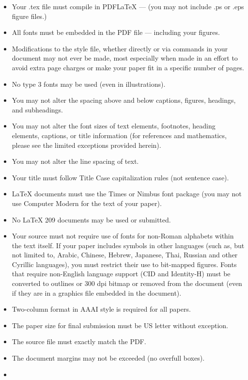 \begin{itemize}
\tightlist
\item
  Your .tex file must compile in PDF{\LaTeX} --- (you may not include
  .ps or .eps figure files.)
\item
  All fonts must be embedded in the PDF file --- including your figures.
\item
  Modifications to the style file, whether directly or via commands in
  your document may not ever be made, most especially when made in an
  effort to avoid extra page charges or make your paper fit in a
  specific number of pages.
\item
  No type 3 fonts may be used (even in illustrations).
\item
  You may not alter the spacing above and below captions, figures,
  headings, and subheadings.
\item
  You may not alter the font sizes of text elements, footnotes, heading
  elements, captions, or title information (for references and
  mathematics, please see the limited exceptions provided herein).
\item
  You may not alter the line spacing of text.
\item
  Your title must follow Title Case capitalization rules (not sentence
  case).
\item
  {\LaTeX} documents must use the Times or Nimbus font package (you may
  not use Computer Modern for the text of your paper).
\item
  No {\LaTeX} 209 documents may be used or submitted.
\item
  Your source must not require use of fonts for non-Roman alphabets
  within the text itself. If your paper includes symbols in other
  languages (such as, but not limited to, Arabic, Chinese, Hebrew,
  Japanese, Thai, Russian and other Cyrillic languages), you must
  restrict their use to bit-mapped figures. Fonts that require
  non-English language support (CID and Identity-H) must be converted to
  outlines or 300 dpi bitmap or removed from the document (even if they
  are in a graphics file embedded in the document).
\item
  Two-column format in AAAI style is required for all papers.
\item
  The paper size for final submission must be US letter without
  exception.
\item
  The source file must exactly match the PDF.
\item
  The document margins may not be exceeded (no overfull boxes).
\item

\end{itemize}
